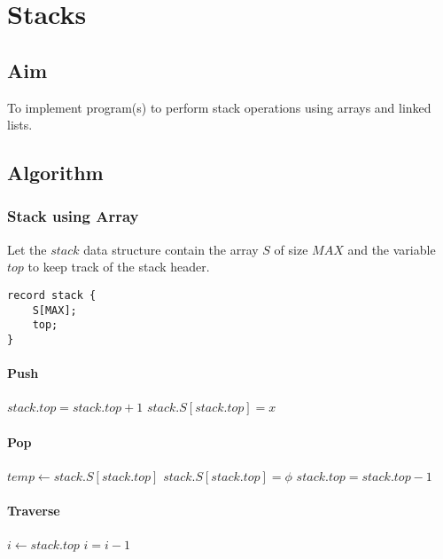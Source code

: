 \chapter{Stacks}

\section{Aim}

{\Large\color{white}
To implement program(s) to perform stack operations using arrays and linked lists.
\color{black}}

\section{Algorithm}

\subsection{Stack using Array}

{\Large\color{white}
Let the $stack$ data structure contain the array $S$ of size $MAX$ and the variable $top$ to keep track of the stack header.
\begin{lstlisting}[style=myC]
record stack {
	S[MAX];
	top;
}
\end{lstlisting}
\color{black}}

\subsubsection{Push}
{\Large\color{white}
\begin{algorithmic}[1]
			\State {}
		\EndIf
		\State $stack.top = stack.top + 1$
		\State $stack.S[stack.top] = x$
	\EndFunction
\end{algorithmic}
\color{black}}

\subsubsection{Pop}
{\Large\color{white}
\begin{algorithmic}[1]
			\State {}
		\EndIf
		\State $temp \gets stack.S[stack.top]$
		\State $stack.S[stack.top] = \phi$
		\State $stack.top = stack.top - 1$
		\State {}
	\EndFunction
\end{algorithmic}
\color{black}}

\subsubsection{Traverse}
{\Large\color{white}
\begin{algorithmic}[1]
			\State {}
		\EndIf

		\State $i \gets stack.top$
			\State {}
			\State $i = i - 1$
		\EndWhile

	\EndFunction
\end{algorithmic}
\color{black}}

